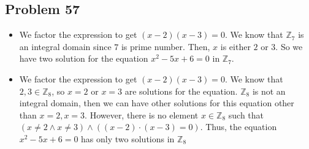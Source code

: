 \documentclass[a4paper,12pt]{article}
\begin{document}
\subsection*{Problem 57}
\begin{itemize}
    \item [a)] We factor the expression to get $(x-2)(x-3)=0$. We know that $\mathbb{Z}_7$ is an integral domain since $7$ is prime number. Then, $x$ is either $2$ or $3$. So we have two solution for the equation $x^2 - 5x + 6=0$ in $\mathbb{Z}_7$.
    \item [b)] We factor the expression to get $(x-2)(x-3)=0$. We know that $2, 3 \in \mathbb{Z}_8$, so $x=2$ or $x=3$ are solutions for the equation. $\mathbb{Z}_8$ is not an integral domain, then we can have other solutions for this equation other than $x=2,x=3.$ However, there is no element $x \in \mathbb{Z}_8$ such that $(x\ne 2 \wedge x\ne 3) \wedge ((x-2) \cdot (x-3)=0).$ Thus, the equation $x^2 - 5x + 6=0$ has only two solutions in $\mathbb{Z}_8$
\end{itemize}
\end{document}
